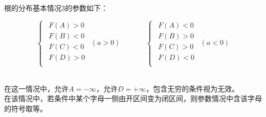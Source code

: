 \documentclass[UTF8]{ctexart}
\begin{document}
    根的分布基本情况$3$的参数如下：\vspace{8pt}
    \begin{large}
        \begin{equation*}
            \begin{cases}
                ~~F(A)>0\\[6mm]
                ~~F(B)<0\\[6mm]
                ~~F(C)<0\\[6mm]
                ~~F(D)>0\\[1mm]
            \end{cases}
            ~~(a>0)
            ~~~~~~~~~~~~~~~~
            \begin{cases}
                ~~F(A)<0\\[6mm]
                ~~F(B)>0\\[6mm]
                ~~F(C)>0\\[6mm]
                ~~F(D)<0\\[1mm]
            \end{cases}
            ~~(a<0)
        \end{equation*}
    \end{large}\\[1mm]
    在这一情况中，允许$A=-\infty$，允许$D=+\infty$，包含无穷的条件视为无效。\\[3mm]
    在该情况中，若条件中某个字母一侧由开区间变为闭区间，则参数情况中含该字母的符号取等。

\newpage
\end{document}
